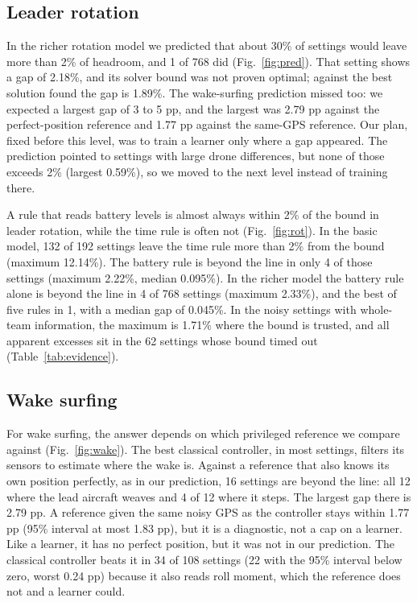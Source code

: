 \documentclass[11pt]{article}
\begin{document}
\subsection{Leader rotation}

In the richer rotation model we predicted that about 30\% of settings would leave more than 2\% of headroom, and 1 of 768 did (Fig.~\ref{fig:pred}).
That setting shows a gap of 2.18\%, and its solver bound was not proven optimal; against the best solution found the gap is 1.89\%.
The wake-surfing prediction missed too: we expected a largest gap of 3 to 5 pp, and the largest was 2.79 pp against the perfect-position reference and 1.77 pp against the same-GPS reference.
Our plan, fixed before this level, was to train a learner only where a gap appeared. The prediction pointed to settings with large drone differences, but none of those exceeds 2\% (largest 0.59\%), so we moved to the next level instead of training there.

A rule that reads battery levels is almost always within 2\% of the bound in leader rotation, while the time rule is often not (Fig.~\ref{fig:rot}).
In the basic model, 132 of 192 settings leave the time rule more than 2\% from the bound (maximum 12.14\%).
The battery rule is beyond the line in only 4 of those settings (maximum 2.22\%, median 0.095\%).
In the richer model the battery rule alone is beyond the line in 4 of 768 settings (maximum 2.33\%), and the best of five rules in 1, with a median gap of 0.045\%.
In the noisy settings with whole-team information, the maximum is 1.71\% where the bound is trusted, and all apparent excesses sit in the 62 settings whose bound timed out (Table~\ref{tab:evidence}).

\subsection{Wake surfing}

For wake surfing, the answer depends on which privileged reference we compare against (Fig.~\ref{fig:wake}).
The best classical controller, in most settings, filters its sensors to estimate where the wake is.
Against a reference that also knows its own position perfectly, as in our prediction, 16 settings are beyond the line: all 12 where the lead aircraft weaves and 4 of 12 where it steps.
The largest gap there is 2.79 pp.
A reference given the same noisy GPS as the controller stays within 1.77 pp (95\% interval at most 1.83 pp), but it is a diagnostic, not a cap on a learner. Like a learner, it has no perfect position, but it was not in our prediction. The classical controller beats it in 34 of 108 settings (22 with the 95\% interval below zero, worst 0.24 pp) because it also reads roll moment, which the reference does not and a learner could.
\end{document}
